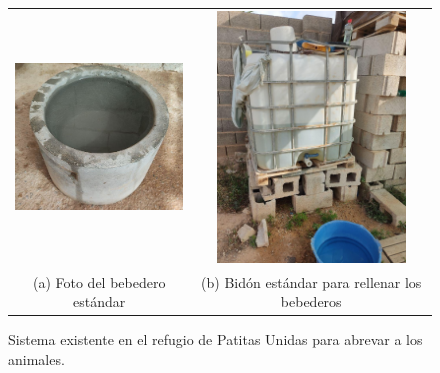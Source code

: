 \documentclass[12pt]{article}
\begin{document}
	
	\begin{figure}[h!]
		\begin{center}
			\begin{tabular}{cc}
				\includegraphics[width=55mm]{img/bebedero_refugio.jpg} &   \includegraphics[width=50mm]{img/bidon_refugio.jpg} \\
				(a) Foto del bebedero estándar & (b) Bidón estándar para rellenar los bebederos\\[6pt]
			\end{tabular}
			\caption{Sistema existente en el refugio de Patitas Unidas para abrevar a los animales. }
			\label{fig: sistema bebedero refugio.}
		\end{center}
	\end{figure}
	
	\pagebreak
	
\end{document}
